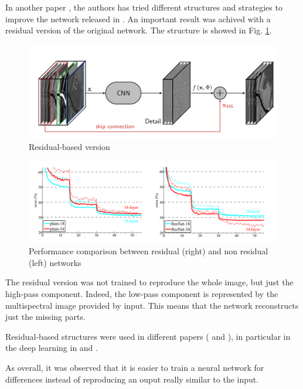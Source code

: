 \documentclass[12pt]{report}
\begin{document}
In another paper \cite{residualpnn}, the authors has tried different structures and strategies to improve the network released in \cite{pnn}.
An important result was achived with a residual version of the original network.
The structure is showed in Fig. \ref{fig:residual-architecture}.

\begin{figure}[t]
    \centering
    \includegraphics[scale=.35]{residualpnn-architecture.png}
    \caption{Residual-based version \cite{residualpnn}}
    \label{fig:residual-architecture}
\end{figure}

\begin{figure}[t]
    \centering
    \includegraphics[scale=.35]{residual_comparison.png}
    \caption{Performance comparison between residual (right) and non residual (left) networks \cite{residual4}}
    \label{fig:residual-comparison}
\end{figure}

The residual version was not trained to reproduce the whole image,
but just the high-pass component. Indeed, the low-pass component is represented by the 
multispectral image provided by input. This means that the network reconstructs just the missing parts.

Residual-based structures were used in different papers ( \cite{residual1} and \cite{residual2}), in particular in the deep learning in \cite{residual3} and \cite{residual4}.

As overall, it was observed that it is easier to train a neural network for differences
instead of reproducing an ouput really similar to the input. 
\end{document}
